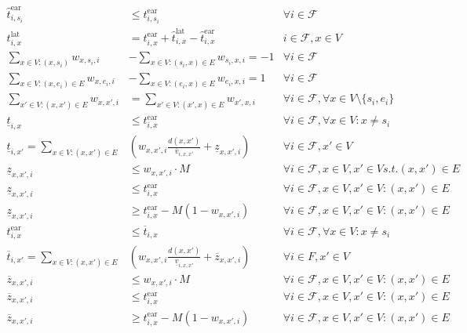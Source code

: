 \documentclass[../thesis.tex]{subfiles}
\begin{document}
\tiny

\begin{align}
  \hat t^\text{ear}_{i,s_i}&\leq  t^\text{ear}_{i,s_i} & \forall i \in \mathcal F\\
    t^\text{lat}_{i,x}&= t^\text{ear}_{i,x}+\hat t^\text{lat}_{i,x} -\hat t^\text{ear}_{i,x}& i\in \mathcal F, x \in V\\
    \sum_{x\in V:(x,s_i)} w_{x,s_i,i} &- \sum_{x\in V:(s_i,x)\in E} w_{s_i,x,i} = -1 & \forall i \in \mathcal{F} \\
    \sum_{x\in V:(x,e_i)\in E} w_{x,e_{i},i} &- \sum_{x\in V:(e_i,x)\in E} w_{e_{i},x,i} = 1 & \forall i \in \mathcal{F} \\
    \sum_{x'\in V:(x,x')\in E} w_{x,x',i} &= \sum_{x'\in V:(x',x)\in E} w_{x',x,i} & \forall i \in \mathcal{F}, \forall x \in V\setminus\{s_{i}, e_{i}\}\\
    \underline t_{i,x} &\leq t^\text{ear}_{i,x}&\forall i \in \mathcal F, \forall x\in V: x\neq s_i\\
    \underline t_{i,x'}=\sum_{x\in V: (x,x')\in E} &\left(w_{x,x',i} \frac{d(x,x')}{\overline v_{i,x,x'}} + \underline z_{x,x',i}\right)
    &\forall i\in \mathcal F, x'\in V\\
    \underline z_{x,x',i}&\leq w_{x,x',i}\cdot M &\forall i\in \mathcal F,x \in V,x'\in V s.t. (x,x')\in E\\
    \underline z_{x,x',i}&\leq t^\text{ear}_{i,x} &\forall i\in \mathcal F,x \in V,x'\in V: (x,x')\in E\\
    \underline z_{x,x',i}&\geq t^\text{ear}_{i,x}-M (1-w_{x,x',i}) &\forall i\in \mathcal F,x \in V,x'\in V: (x,x')\in E\\
    t^\text{ear}_{i,x} &\leq \overline t_{i,x}&\forall i\in \mathcal F,\forall x\in V: x\neq s_i\\
    \overline t_{i,x'}=\sum_{x\in V: (x,x')\in E}&\left(w_{x,x',i}\frac{d(x,x')}{\underline v_{i,x,x'}}+\overline z_{x,x',i}\right) &\forall i \in F, x'\in V\\
    \overline z_{x,x',i}&\leq w_{x,x',i}\cdot M &\forall i\in \mathcal F,x \in V,x'\in V: (x,x')\in E\\
    \overline z_{x,x',i}&\leq t^\text{ear}_{i,x} &\forall i\in \mathcal F,x \in V,x'\in V: (x,x')\in E\\
    \overline z_{x,x',i}&\geq t^\text{ear}_{i,x}-M (1-w_{x,x',i}) &\forall i\in \mathcal F,x \in V,x'\in V: (x,x')\in E\\

\end{align}
\end{document}
